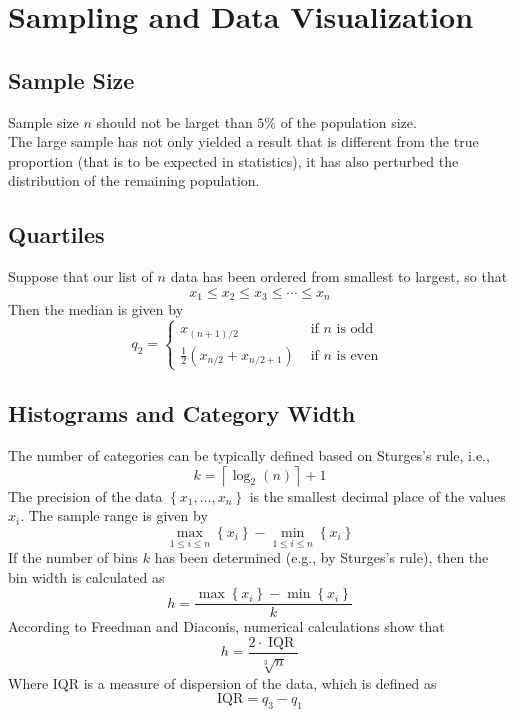 \documentclass[a4paper,12pt]{article}
\begin{document}
\section{Sampling and Data Visualization}
\subsection{Sample Size}
    Sample size $n$ should not be larget than $5\%$ of the population size.\\
    The large sample has not only yielded a result that is different from
the true proportion (that is to be expected in statistics), it has also
perturbed the distribution of the remaining population.
\subsection{Quartiles}
Suppose that our list of $n$ data has been ordered from smallest to largest, so that
$$
x_1 \leq x_2 \leq x_3 \leq \cdots \leq x_n
$$
Then the median is given by
$$
q_2= \begin{cases}x_{(n+1) / 2} & \text { if } n \text { is odd } \\ \frac{1}{2}\left(x_{n / 2}+x_{n / 2+1}\right) & \text { if } n \text { is even }\end{cases}
$$

\subsection{Histograms and Category Width}
    The number of categories can be typically defined based on Sturges's rule, i.e.,
    \begin{equation}
    k=\left\lceil\log _2(n)\right\rceil+1
    \end{equation}
    The precision of the data $\left\{x_1, \ldots, x_n\right\}$ is the smallest decimal place of the values $x_i$.
The sample range is given by
$$
\max _{1 \leq i \leq n}\left\{x_i\right\}-\min _{1 \leq i \leq n}\left\{x_i\right\}
$$
If the number of bins $k$ has been determined (e.g., by Sturges's rule), then the bin width is calculated as
\begin{equation}
h=\frac{\max \left\{x_i\right\}-\min \left\{x_i\right\}}{k}
\end{equation}
According to Freedman and Diaconis, numerical calculations show that
\begin{equation}
h=\frac{2 \cdot \mathrm{\operatorname{IQR}}}{\sqrt[3]{n}}
\end{equation}
Where $\mathrm{IQR}$ is a measure of dispersion of the data, which is defined as
\begin{equation}
\mathrm{IQR}=q_3-q_1
\end{equation}
\end{document}
